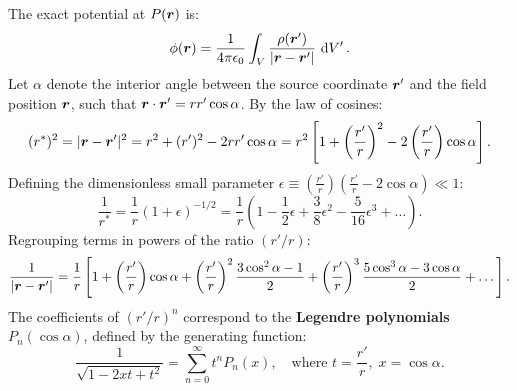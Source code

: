 \begin{center}
\end{center}

The exact potential at \(P(\bm{r})\) is:
\begin{equation}
    \phi(\bm{r}) = \frac{1}{4\pi\epsilon_0} \int_V \frac{\rho(\bm{r}')}{|\bm{r} - \bm{r}'|}\,\dd{V'}.
\end{equation}
Let \(\alpha\) denote the interior angle between the source coordinate \(\bm{r}'\) and the field position \(\bm{r}\), such that \(\bm{r} \cdot \bm{r}' = r r'\cos\alpha\). By the law of cosines:
\begin{equation}
    (r^*)^2 = |\bm{r} - \bm{r}'|^2 = r^2 + (r')^2 - 2rr'\cos\alpha = r^2 \left[ 1 + \left(\frac{r'}{r}\right)^2 - 2\left(\frac{r'}{r}\right)\cos\alpha \right].
\end{equation}
Defining the dimensionless small parameter \(\epsilon \equiv \left(\frac{r'}{r}\right)\left(\frac{r'}{r} - 2\cos\alpha\right) \ll 1\):
\begin{equation}
    \frac{1}{r^*} = \frac{1}{r}(1 + \epsilon)^{-1/2} = \frac{1}{r}\left(1 - \frac{1}{2}\epsilon + \frac{3}{8}\epsilon^2 - \frac{5}{16}\epsilon^3 + \dots\right).
\end{equation}
Regrouping terms in powers of the ratio \((r'/r)\):
\begin{equation}
    \frac{1}{|\bm{r} - \bm{r}'|} = \frac{1}{r}\left[ 1 + \left(\frac{r'}{r}\right)\cos\alpha + \left(\frac{r'}{r}\right)^2 \frac{3\cos^2\alpha - 1}{2} + \left(\frac{r'}{r}\right)^3 \frac{5\cos^3\alpha - 3\cos\alpha}{2} + \dots \right].
\end{equation}
The coefficients of \((r'/r)^n\) correspond to the \textbf{Legendre polynomials} \(P_n(\cos\alpha)\), defined by the generating function:
\begin{equation}
    \frac{1}{\sqrt{1 - 2xt + t^2}} = \sum_{n=0}^\infty t^n P_n(x), \quad \text{where } t = \frac{r'}{r},\; x = \cos\alpha.
\end{equation}

